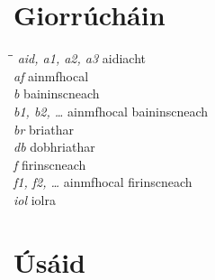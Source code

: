 
\newpage
\chapter*{Giorr\'uch\'ain} 
\begin{tabbing}
\hspace*{35ex}\=\hspace{25ex}\=\kill
\> {\it aid, a1, a2, a3} \> aidiacht \\
\> {\it af} \> ainmfhocal \\
\> {\it b} \> baininscneach \\
\> {\it b1, b2, \ldots} \> ainmfhocal baininscneach \\
\> {\it br} \> briathar \\
\> {\it db} \> dobhriathar \\
\> {\it f} \> firinscneach \\
\> {\it f1, f2, \ldots} \> ainmfhocal firinscneach \\
\> {\it iol} \> iolra \\
\end{tabbing}

\chapter*{{\'U}s\'aid} 

